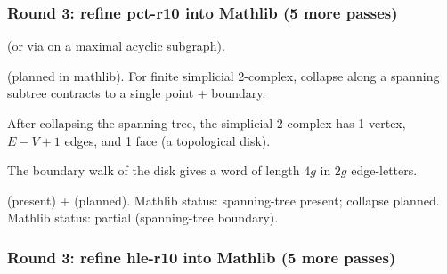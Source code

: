 \subsubsection*{Round 3: refine pct-r10 into Mathlib (5 more passes)}

\begin{lemma}
\label{lem:pct-r11}
 (or via  on a maximal acyclic subgraph).
\leanok\mathlibok
\end{lemma}

\begin{lemma}
\label{lem:pct-r12}
 (planned in mathlib).  For finite simplicial 2-complex, collapse along a spanning subtree contracts to a single point + boundary.
\leanok\mathlibok
\end{lemma}

\begin{lemma}
\label{lem:pct-r13}
After collapsing the spanning tree, the simplicial 2-complex has 1 vertex, $E - V + 1$ edges, and 1 face (a topological disk).
\leanok
\end{lemma}

\begin{lemma}[Pass pct.14: boundary edge word = relator]
\label{lem:pct-r14}
The boundary walk of the disk gives a word of length $4g$ in $2g$ edge-letters.
\leanok
\end{lemma}

\begin{lemma}
\label{lem:pct-r15}
 (present) +  (planned).  Mathlib status: spanning-tree present; collapse planned.  Mathlib status: partial (spanning-tree boundary).
\leanok\mathlibok
\end{lemma}

\subsubsection*{Round 3: refine hle-r10 into Mathlib (5 more passes)}


